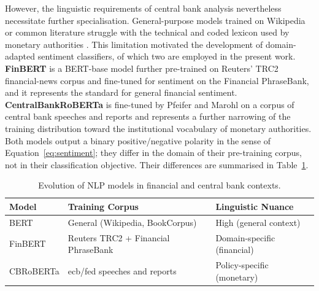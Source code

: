 However, the linguistic requirements of central bank analysis nevertheless necessitate further specialisation. General-purpose models trained on Wikipedia or common literature struggle with the technical and coded lexicon used by monetary authorities \cite{BIS_WP1215_2024}. This limitation motivated the development of domain-adapted sentiment classifiers, of which two are employed in the present work. \textbf{FinBERT} \cite{araci2019finbert} is a BERT-base model further pre-trained on Reuters' TRC2 financial-news corpus and fine-tuned for sentiment on the Financial PhraseBank, and it represents the standard for general financial sentiment. \textbf{CentralBankRoBERTa} \cite{Pfeifer2023} is fine-tuned by Pfeifer and Marohl on a corpus of central bank speeches and reports and represents a further narrowing of the training distribution toward the institutional vocabulary of monetary authorities. Both models output a binary positive/negative polarity in the sense of Equation~\ref{eq:sentiment}; they differ in the domain of their pre-training corpus, not in their classification objective. Their differences are summarised in Table~\ref{tab:model_comparison}.

\begin{table}[ht]
    \centering
    \caption{Evolution of NLP models in financial and central bank contexts.}
    \label{tab:model_comparison}
    \begin{tabular}{@{}lll@{}}
        \toprule
        \textbf{Model} & \textbf{Training Corpus}                 & \textbf{Linguistic Nuance}  \\ \midrule
        BERT           & General (Wikipedia, BookCorpus)          & High (general context)      \\
        FinBERT        & Reuters TRC2 + Financial PhraseBank      & Domain-specific (financial) \\
        CBRoBERTa      & \gls{ecb}/\gls{fed} speeches and reports & Policy-specific (monetary)  \\ \bottomrule
    \end{tabular}
\end{table}

